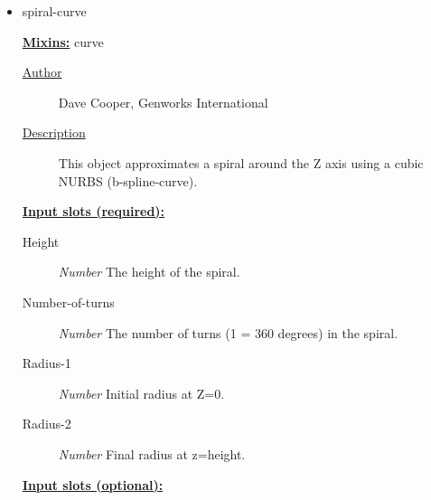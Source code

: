 \documentclass [11pt]{book}
\begin{document}
\begin{itemize}
\begin{description}
\end{description}







\item {}spiral-curve


\textbf{
\underline{Mixins:}} curve





\begin{description}

\item [
\underline{Author}]


Dave Cooper, Genworks International



\item [
\underline{Description}]


This object approximates a spiral around the Z axis using a cubic NURBS (b-spline-curve).



\end{description}








\textbf{
\underline{Input slots (required):}}

\begin{description}

\item [Height]
\emph{Number} The height of the spiral.


\item [Number-of-turns]
\emph{Number} The number of turns (1 = 360 degrees) in the spiral.


\item [Radius-1]
\emph{Number} Initial radius at Z=0.


\item [Radius-2]
\emph{Number} Final radius at z=height.


\end{description}






\textbf{
\underline{Input slots (optional):}}

\begin{description}


\end{description}
\end{itemize}
\end{document}
